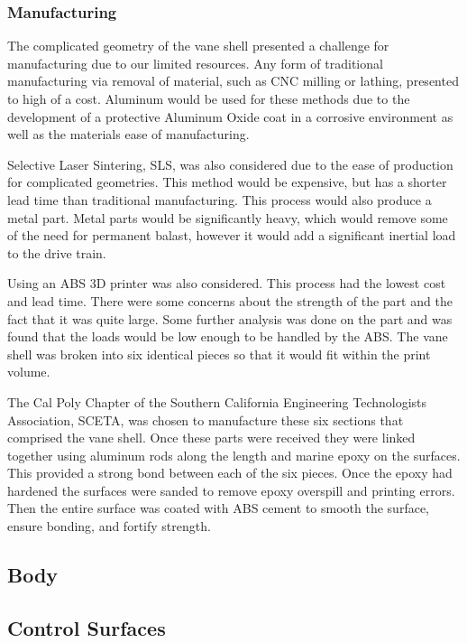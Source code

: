 \documentclass{report}
\begin{document}
\subsubsection{Manufacturing}
The complicated geometry of the vane shell presented a challenge for manufacturing due to our limited resources. Any form of traditional manufacturing via removal of material, such as CNC milling or lathing, presented to high of a cost. Aluminum would be used for these methods due to the development of a protective Aluminum Oxide coat in a corrosive environment as well as the materials ease of manufacturing. \par
Selective Laser Sintering, SLS, was also considered due to the ease of production for complicated geometries. This method would be expensive, but has a shorter lead time than traditional manufacturing. This process would also produce a metal part. Metal parts would be significantly heavy, which would remove some of the need for permanent balast, however it would add a significant inertial load to the drive train.\par
Using an ABS 3D printer was also considered. This process had the lowest cost and lead time. There were some concerns about the strength of the part and the fact that it was quite large. Some further analysis was done on the part and was found that the loads would be low enough to be handled by the ABS. The vane shell was broken into six identical pieces so that it would fit within the print volume. \par
The Cal Poly Chapter of the Southern California Engineering Technologists Association, SCETA, was chosen to manufacture these six sections that comprised the vane shell.  Once these parts were received they were linked together using aluminum rods along the length and marine epoxy on the surfaces. This provided a strong bond between each of the six pieces. Once the epoxy had hardened the surfaces were sanded to remove epoxy overspill and printing errors. Then the entire surface was coated with ABS cement to smooth the surface, ensure bonding, and fortify strength.
\subsection{Body}
\subsection{Control Surfaces}
\end{document}
